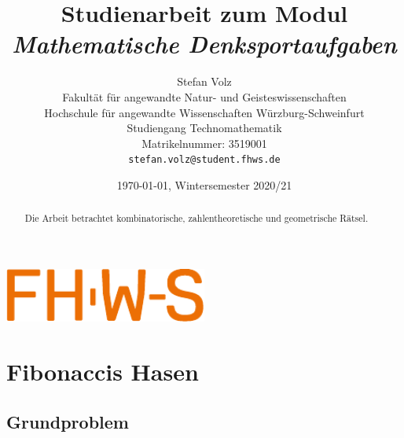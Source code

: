 \documentclass{article}
\title{ Studienarbeit zum Modul \emph{Mathematische Denksportaufgaben} }
\author{
  Stefan Volz\\
  Fakultät für angewandte Natur- und Geisteswissenschaften\\
  Hochschule für angewandte Wissenschaften Würzburg-Schweinfurt\\
  Studiengang Technomathematik\\
  Matrikelnummer: 3519001\\
  \texttt{stefan.volz@student.fhws.de}\\
}
\date{\today, Wintersemester 2020/21}
\theoremstyle{plain} %
\theoremstyle{definition} %
\begin{document}
\begin{center}
  \includegraphics[width=0.5\textwidth]{FHWS}
\end{center}

\maketitle

\begin{abstract}
  Die Arbeit betrachtet kombinatorische, zahlentheoretische und geometrische Rätsel.
\end{abstract}

\tableofcontents
\newpage

\section{Fibonaccis Hasen}

\subsection{Grundproblem}
\end{document}
